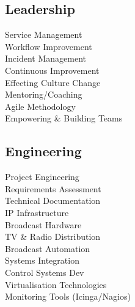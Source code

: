 \documentclass[]{deedy-resume-openfont}
\begin{document}
\begin{minipage}[t]{0.33\textwidth}
\subsection{Leadership}
Service Management \\
Workflow Improvement \\
Incident Management \\
Continuous Improvement \\
Effecting Culture Change \\
Mentoring/Coaching \\
Agile Methodology \\
Empowering \& Building Teams \\
\sectionsep

\subsection{Engineering}
Project Engineering \\
Requirements Assessment \\ 
Technical Documentation \\
IP Infrastructure \\
Broadcast Hardware \\
TV \& Radio Distribution \\
Broadcast Automation \\
Systems Integration \\
Control Systems Dev \\
Virtualisation Technologies \\
Monitoring Tools (Icinga/Nagios)\\

%
%

\end{minipage} 
\hfill
\end{document}
